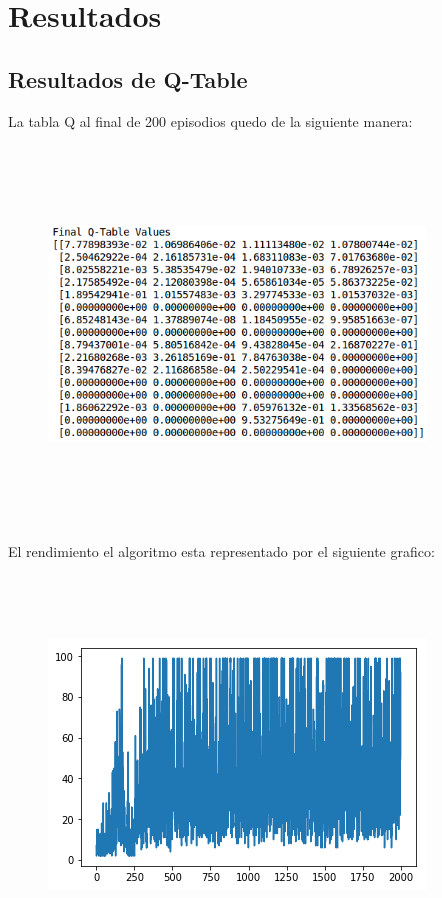 \section{Resultados}

\subsection{Resultados de Q-Table}

La tabla Q al final de 200 episodios quedo de la siguiente manera: 


\begin{figure}[ht]
	\centering
	\includegraphics*[width=10cm,height=10cm,keepaspectratio]{figuras/table_final} 
	\label{fig:valor final Tabla Q}
\end{figure}

El rendimiento el algoritmo esta representado por el siguiente grafico:

\begin{figure}[ht]
	\centering
	\includegraphics*[width=10cm,height=10cm,keepaspectratio]{figuras/plot} 
	\label{fig:plot final}
\end{figure}